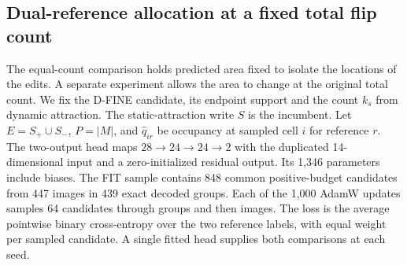 \documentclass[journal]{IEEEtran}
\begin{document}
\subsection{Dual-reference allocation at a fixed total flip count}
\label{sec:variable-sign}
The equal-count comparison holds predicted area fixed to isolate the locations of the edits. A separate experiment allows the area to change at the original total count. We fix the D-FINE candidate, its endpoint support and the count \(k_s\) from dynamic attraction. The static-attraction write \(S\) is the incumbent. Let \(E=S_+\cup S_-\), \(P=|M|\), and \(\hat q_{ir}\) be occupancy at sampled cell \(i\) for reference \(r\). The two-output head maps \(28\to24\to24\to2\) with the duplicated 14-dimensional input and a zero-initialized residual output. Its 1,346 parameters include biases. The FIT sample contains 848 common positive-budget candidates from 447 images in 439 exact decoded groups. Each of the 1,000 AdamW updates samples 64 candidates through groups and then images. The loss is the average pointwise binary cross-entropy over the two reference labels, with equal weight per sampled candidate. A single fitted head supplies both comparisons at each seed.
\end{document}
